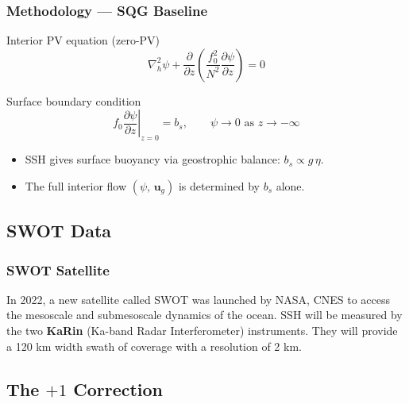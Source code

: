 \documentclass[
	11pt, %
]{beamer}
\begin{document}
\begin{frame}
    \frametitle{Methodology --- SQG Baseline}
    \begin{block}{Interior PV equation (zero-PV)}
        \vspace{-0.5em}
        \begin{equation}
            \nabla_h^2 \psi + \frac{\partial}{\partial z}\!\left(\frac{f_0^2}{N^2}\frac{\partial \psi}{\partial z}\right) = 0
        \end{equation}
    \end{block}
    \begin{block}{Surface boundary condition}
        \vspace{-0.5em}
        \begin{equation}
            f_0 \left.\frac{\partial \psi}{\partial z}\right|_{z=0} = b_s, \qquad \psi \to 0 \text{ as } z\to -\infty
        \end{equation}
    \end{block}
    \begin{itemize}
        \item SSH gives surface buoyancy via geostrophic balance: $b_s \propto g\,\eta$.
        \item The full interior flow $(\psi,\,\mathbf{u}_g)$ is determined by $b_s$ alone.
    \end{itemize}
\end{frame}

\subsection{SWOT Data}
\begin{frame}
    \frametitle{SWOT Satellite}
    In 2022, a new satellite called SWOT was launched by NASA, CNES to access the mesoscale and submesoscale dynamics of the ocean. SSH will be measured by the two \textbf{KaRin} (Ka-band Radar Interferometer) instruments. They will provide a 120 km width swath of coverage with a resolution of 2 km. 
\end{frame}

\subsection{The $+1$ Correction}
\end{document}
